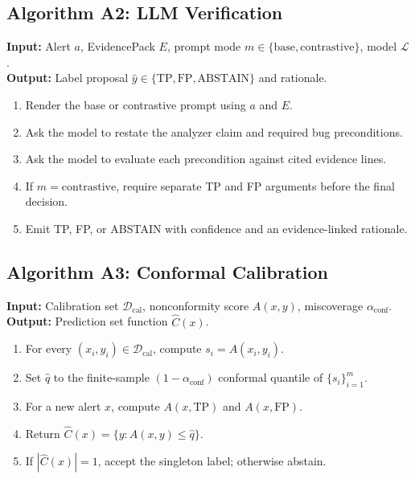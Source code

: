 \subsection{Algorithm A2: LLM Verification}

\begin{algorithm}[h]
\label{alg:verify}
\textbf{Input:} Alert $a$, EvidencePack $E$, prompt mode $m\in\{\text{base},\text{contrastive}\}$, model $\mathcal L$.\\
\textbf{Output:} Label proposal $\hat y\in\{\mathrm{TP},\mathrm{FP},\mathrm{ABSTAIN}\}$ and rationale.
\begin{enumerate}
\item Render the base or contrastive prompt using $a$ and $E$.
\item Ask the model to restate the analyzer claim and required bug preconditions.
\item Ask the model to evaluate each precondition against cited evidence lines.
\item If $m=\text{contrastive}$, require separate TP and FP arguments before the final decision.
\item Emit TP, FP, or ABSTAIN with confidence and an evidence-linked rationale.
\end{enumerate}
\end{algorithm}

\subsection{Algorithm A3: Conformal Calibration}

\begin{algorithm}[h]
\label{alg:conformal}
\textbf{Input:} Calibration set $\mathcal D_{\mathrm{cal}}$, nonconformity score $A(x,y)$, miscoverage $\alpha_{\mathrm{conf}}$.\\
\textbf{Output:} Prediction set function $\hat C(x)$.
\begin{enumerate}
\item For every $(x_i,y_i)\in\mathcal D_{\mathrm{cal}}$, compute $s_i=A(x_i,y_i)$.
\item Set $\hat q$ to the finite-sample $(1-\alpha_{\mathrm{conf}})$ conformal quantile of $\{s_i\}_{i=1}^m$.
\item For a new alert $x$, compute $A(x,\mathrm{TP})$ and $A(x,\mathrm{FP})$.
\item Return $\hat C(x)=\{y:A(x,y)\le\hat q\}$.
\item If $|\hat C(x)|=1$, accept the singleton label; otherwise abstain.
\end{enumerate}
\end{algorithm}

